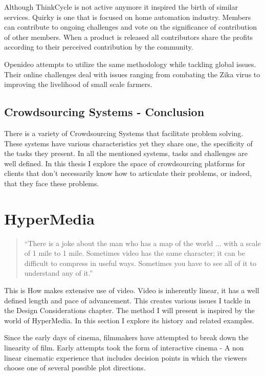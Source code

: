 Although ThinkCycle is not active anymore it inspired the birth of similar services. Quirky\cite{quirky} is one that is focused on home automation industry. Members can contribute to ongoing challenges and vote on the significance of contribution of other members. When a product is released all contributors share the profits according to their perceived contribution by the community. 

Openideo\cite{openideo} attempts to utilize the same methodology while tackling global issues.  Their online challenges deal with issues ranging from combating the Zika virus to improving the livelihood of small scale farmers. 

\subsection{Crowdsourcing Systems - Conclusion}

There is a variety of Crowdsourcing Systems that facilitate problem solving. These systems have various characteristics yet they share one, the specificity of the tasks they present. In all the mentioned systems, tasks and challenges are well defined. In this thesis I explore the space of crowdsourcing platforms for clients that don’t necessarily know how to articulate their problems, or indeed, that they face these problems.

\section{HyperMedia}
\begin{quotation}
``There is a joke about the man who has a map of the world ... with a scale of 1 mile to 1 mile. Sometimes video has the same character; it can be difficult to compress in useful ways. Sometimes you have to see all of it to understand any of it.''  \cite{mackay1989eva}
\end{quotation}

This is How makes extensive use of video. Video is inherently linear, it has a well defined length and pace of advancement. This creates various issues I tackle in the Design Considerations chapter. The method I will present is inspired by the world of HyperMedia. In this section I explore its history and related examples.

Since the early days of cinema, filmmakers have attempted to break down the linearity of film. Early attempts took the form of interactive cinema - A non linear cinematic experience that includes decision points in which the viewers choose one of several possible plot directions.

